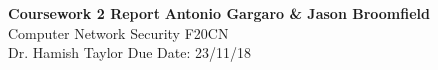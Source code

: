 \documentclass[a4paper, 11pt]{article}
\begin{document}
\noindent
\large\textbf{Coursework 2 Report} \hfill \textbf{Antonio Gargaro \& Jason Broomfield} \\
\normalsize Computer Network Security F20CN \\
Dr. Hamish Taylor  \hfill Due Date: 23/11/18  \\

\tableofcontents
\newpage


\newpage




\newpage


\newpage



\newpage



\newpage



\newpage



\newpage



\newpage


\newpage

\end{document}

